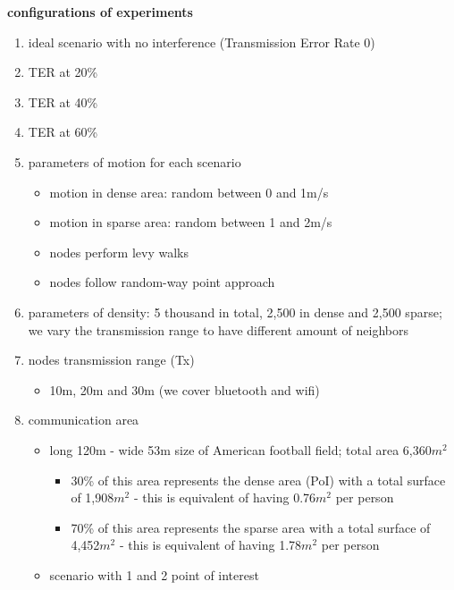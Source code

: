 \textbf{configurations of experiments}
\begin{enumerate}
	\item ideal scenario with no interference (Transmission Error Rate 0)
	\item TER at 20\%
	\item TER at 40\%
	\item TER at 60\%
	\item parameters of motion for each scenario
	\begin{itemize}
		\item motion in dense area: random between 0 and 1m/s
		\item motion in sparse area: random between 1 and 2m/s
		\item nodes perform levy walks \cite{rhee2011levy}
		\item nodes follow random-way point approach
	\end{itemize}
	\item parameters of density: 5 thousand in total, 2,500 in dense and 2,500 sparse; we vary the transmission range to have different amount of neighbors
	\item nodes transmission range (Tx)
	\begin{itemize}
		\item 10m, 20m and 30m (we cover bluetooth and wifi)
	\end{itemize}
	\item communication area
	\begin{itemize}
		\item long 120m - wide 53m size of American football field; total area 6,360$m^{2}$
		\begin{itemize}
			\item 30\% of this area represents the dense area (PoI) with a total surface of 1,908$m^{2}$ - this is equivalent of having 0.76$m^{2}$ per person
			\item 70\% of this area represents the sparse area with a total surface of 4,452$m^{2}$ - this is equivalent of having 1.78$m^{2}$ per person
		\end{itemize}
		\item scenario with 1 and 2 point of interest
	\end{itemize}
\end{enumerate}



